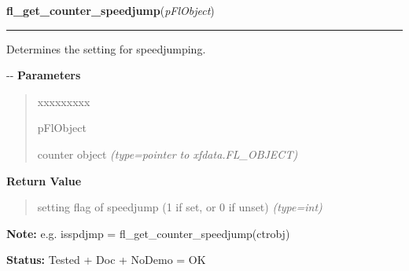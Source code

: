 \hspace{.8\funcindent}\begin{boxedminipage}{\funcwidth}

    \raggedright \textbf{fl\_get\_counter\_speedjump}(\textit{pFlObject})

    \vspace{-1.5ex}

    \rule{\textwidth}{0.5\fboxrule}
\setlength{\parskip}{2ex}

Determines the setting for speedjumping.

-{}-
\setlength{\parskip}{1ex}
      \textbf{Parameters}
      \vspace{-1ex}

      \begin{quote}
        \begin{Ventry}{xxxxxxxxx}

          \item[pFlObject]


counter object
            {\it (type=pointer to xfdata.FL\_OBJECT)}

        \end{Ventry}

      \end{quote}

      \textbf{Return Value}
    \vspace{-1ex}

      \begin{quote}

setting flag of speedjump (1 if set, or 0 if unset)
      {\it (type=int)}

      \end{quote}

\textbf{Note:} 
e.g. isspdjmp = fl\_get\_counter\_speedjump(ctrobj)


\textbf{Status:} 
Tested + Doc + NoDemo = OK


    \end{boxedminipage}

    \label{xformslib:flcounter:fl_set_counter_speedjump}

    \vspace{0.5ex}

